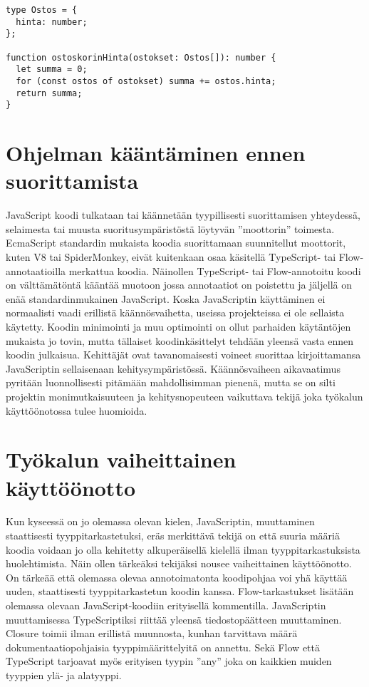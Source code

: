 \begin{minipage}{\linewidth}
\begin{lstlisting}[caption=Esimerkki Flow tai TypeScript annotaatiosta funktiolle]
type Ostos = {
  hinta: number;
};

function ostoskorinHinta(ostokset: Ostos[]): number {
  let summa = 0;
  for (const ostos of ostokset) summa += ostos.hinta;
  return summa;
}
\end{lstlisting}
\end{minipage}

\section{Ohjelman kääntäminen ennen suorittamista}

JavaScript koodi tulkataan tai käännetään tyypillisesti suorittamisen
yhteydessä, selaimesta tai muusta suoritusympäristöstä löytyvän ”moottorin”
toimesta. EcmaScript standardin mukaista koodia suorittamaan suunnitellut
moottorit, kuten V8 tai SpiderMonkey, eivät kuitenkaan osaa käsitellä
TypeScript- tai Flow-annotaatioilla merkattua koodia. Näinollen TypeScript-
tai Flow-annotoitu koodi on välttämätöntä kääntää muotoon jossa
annotaatiot on poistettu ja jäljellä on enää standardinmukainen JavaScript.
Koska JavaScriptin käyttäminen ei normaalisti vaadi erillistä
käännösvaihetta, useissa projekteissa ei ole sellaista käytetty. Koodin
minimointi ja muu optimointi on ollut parhaiden käytäntöjen mukaista jo
tovin, mutta tällaiset koodinkäsittelyt tehdään yleensä vasta ennen koodin
julkaisua. Kehittäjät ovat tavanomaisesti voineet suorittaa kirjoittamansa
JavaScriptin sellaisenaan kehitysympäristössä. Käännösvaiheen aikavaatimus
pyritään luonnollisesti pitämään mahdollisimman pienenä, mutta se on silti
projektin monimutkaisuuteen ja kehitysnopeuteen vaikuttava tekijä joka
työkalun käyttöönotossa tulee huomioida.

\section{Työkalun vaiheittainen käyttöönotto}

Kun kyseessä on jo olemassa olevan kielen, JavaScriptin, muuttaminen
staattisesti tyyppitarkastetuksi, eräs merkittävä tekijä on että suuria
määriä koodia voidaan jo olla kehitetty alkuperäisellä kielellä ilman
tyyppitarkastuksista huolehtimista. Näin ollen tärkeäksi tekijäksi nousee
vaiheittainen käyttöönotto. On tärkeää että olemassa olevaa annotoimatonta
koodipohjaa voi yhä käyttää uuden, staattisesti tyyppitarkastetun koodin
kanssa. Flow-tarkastukset lisätään olemassa olevaan JavaScript-koodiin
erityisellä kommentilla. JavaScriptin muuttamisessa TypeScriptiksi riittää
yleensä tiedostopäätteen muuttaminen. Closure toimii ilman erillistä
muunnosta, kunhan tarvittava määrä dokumentaatiopohjaisia tyyppimäärittelyitä
on annettu. Sekä Flow että TypeScript tarjoavat myös erityisen tyypin ”any”
joka on kaikkien muiden tyyppien ylä- ja alatyyppi.